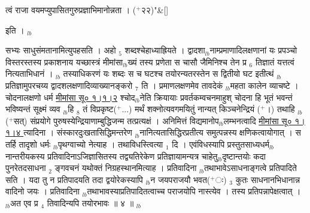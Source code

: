 \documentclass[article,12pt,a4paper]{memoir}%
\newcommand{\add}[1]{($^{+}$#1)}
\newcounter{parCount}
\begin{document}
	    
	    \stanza[\smallbreak]
	  त्वं राजा वयमप्युपासितगुरुप्रज्ञाभिमानोन्नता । \add{२२}{\normalfontlatin\large\qquad{}"}\&[\smallbreak]
	  
	  
	  
	    \pstart  \leavevmode%
	    \hphantom{.}
	  इति ।
	{}
	\pend%
      {\tiny $_{lb}$}

	  
	  \pstart \leavevmode%
	\hphantom{.}सभ्यः साधुसंमतानामित्युपहसति । {\color{DodgerBlue3}अहो} {\tiny $_{5}$} शब्दश्चेहाध्याह्रियते । द्वादशा{\tiny $_{lb}$}नाम्प्रमाणादिलक्षणानां यः प्रपञ्चो विस्तरस्तस्य प्रकाशनाय यच्छास्त्रं मीमांसा{\tiny $_{lb}$}ख्यं तस्य प्रणेता स चासौ जैमिनिश्च तेन प्र {\tiny $_{6}$} तिज्ञातं यत्तत्वं नित्यताभिधानं । {\tiny $_{lb}$} \leavevmode{} तस्याधिकरणं यः शब्दः स च घटश्च तयोरन्यतरस्तेन स द्वितीयो घट इतीत्थं {\tiny $_{lb}$}प्रतिज्ञामुपरचय्य द्वादशलक्षणादिव्याख्यानङ्करो {\tiny $_{7}$} ति । प्रमाणलक्षणमेव तावदेकं {\tiny $_{lb}$}महता कालेन व्याचष्टे । चोदनालक्षणो धर्म \href{http://sarit.indology.info/?cref=M\%C4\%ABS\%C5\%AB.1.1.2}{मीमांसा सू० १।१।२} श्चोद{\tiny $_{lb}$}नेति क्रियायाः प्रवर्तकम्वचनमाहुश् {\color{DodgerBlue3}चोदना हि भूतं भवन्तं भविष्यन्तं सूक्ष्मं व्यव {\tiny $_{lb}$}हि {\tiny $_{8}$} \leavevmode{} तं विप्रकृष्ट\add{...} मर्थं शक्नोत्यवगमयितुं नान्यत् किञ्चनेन्द्रियं} \add{।} तथाहि {\tiny $_{lb}$} \add{सत्} संप्रयोगे पुरुषस्येन्द्रियाणाम्बुद्धिजन्म तत्प्रत्यक्षं । अनिमित्तं विद्यमानोप{\tiny $_{lb}$}लम्भनत्वादि \href{http://sarit.indology.info/?cref=M\%C4\%ABS\%C5\%AB.1.1.4}{मीमांसा सू० १।१।४ } त्यादिना । संस्कारदुःखतासिद्धिमन्तरेण {\tiny $_{lb}$}नानित्यतासिद्धिरप्रतीत्य समुत्पन्नस्य क्षणिकत्वायोगात् । स तर्हि तादृशो धर्मः {\tiny $_{lb}$}पृथग्वाच्यो नेत्याह । {\color{DodgerBlue3}तथाविधस्त्वित्या} {\tiny $_{1}$} दि । एवंविधस्यापि प्रस्तुतसाध्यधर्म{\tiny $_{lb}$}नान्तरीयकस्य प्रतिवादिनाऽजिज्ञासितस्य तद्व्यतिरेकेण प्रतिज्ञायामन्यत्र चाहेतु{\tiny $_{lb}$}दृष्टान्तयोः कदा पुनरेतदसाधना {\tiny $_{2}$} ङ्गवचनं यथोक्तं निग्रहस्थानमित्याह । {\color{DodgerBlue3}प्रतिवादिना} {\tiny $_{lb}$}तथाभावेऽसाधनाङ्गत्वे प्रतिपादिते सति । यदा तु न प्रतिपादयति तदा द्वयोरेकस्यापि {\tiny $_{lb}$}न जयपराजयौ भवत\add{ः} {\tiny $_{3}$} कुतः साधनानभिधानान्न वादिनो जयः । प्रतिवादिना {\tiny $_{lb}$}तथाभावस्याप्रतिपादितत्वाच्च पराजयोपि नास्त्येव । तस्य प्रतिपन्नापेक्षत्वात् । {\tiny $_{lb}$}अत एव प्र {\tiny $_{4}$} तिवादिन्यपि तयोरभावः ॥ ४ ॥
	{}
	\pend%
      {\tiny $_{lb}$}
\end{document}

